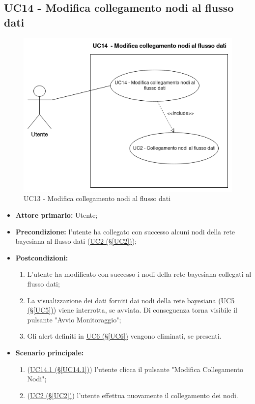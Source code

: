 \pagebreak

\subsection{UC14 - Modifica collegamento nodi al flusso dati}\label{UC14}

\begin{figure}[H]
\centering
\includegraphics[scale=0.6]{./images/UC14.png}
\caption{UC13 - Modifica collegamento nodi al flusso dati}
\end{figure}


\begin{itemize}
\item \textbf{Attore primario:} Utente;
\item \textbf{Precondizione:} l'utente ha collegato con successo alcuni nodi della rete bayesiana al flusso dati (\hyperref[UC2]{UC2 (§\ref*{UC2})});
\item \textbf{Postcondizioni:} 
	\begin{enumerate}
	\item L'utente ha modificato con successo i nodi della rete bayesiana collegati al flusso dati;
	\item La visualizzazione dei dati forniti dai nodi della rete bayesiana (\hyperref[UC5]{UC5 (§\ref*{UC5})}) viene interrotta, se avviata. Di conseguenza torna visibile il pulsante "Avvio Monitoraggio";
	\item Gli alert definiti in \hyperref[UC6]{UC6 (§\ref*{UC6})} vengono eliminati, se presenti.
	\end{enumerate}
\item \textbf{Scenario principale:}
	\begin{enumerate}
	\item (\hyperref[UC14.1]{UC14.1 (§\ref*{UC14.1})}) l'utente clicca il pulsante "Modifica Collegamento Nodi";
	\item (\hyperref[UC2]{UC2 (§\ref*{UC2})}) l'utente effettua nuovamente il collegamento dei nodi.
	\end{enumerate}
\end{itemize}

